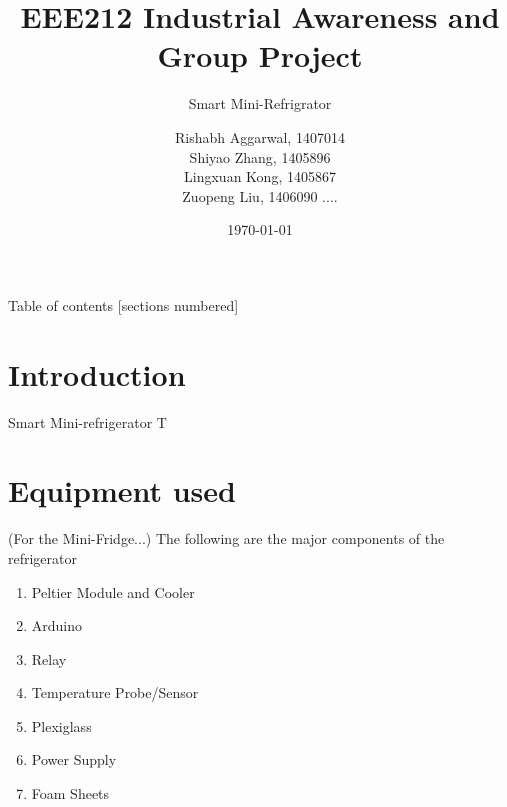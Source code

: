\documentclass[10pt]{beamer}
\title{EEE212 Industrial Awareness and Group Project}
\subtitle{Smart Mini-Refrigrator}
\date{\today}
\author{Rishabh Aggarwal, 1407014\\Shiyao Zhang, 1405896\\Lingxuan Kong, 1405867\\Zuopeng Liu, 1406090 ....}
\institute{Department of Electrical and Electronics Engineering, XJTLU}
\begin{document}
\maketitle
{
\begin{frame}{Table of contents}
  [sections numbered]
  \tableofcontents[hideallsubsections]
\end{frame}
}
\section{Introduction}
{
\begin{frame}[fragile]{Smart Mini-refrigerator}
	T
\end{frame}
}


\section{Equipment used}
{	
	\begin{frame}(For the Mini-Fridge...)
	The following are the major components of the refrigerator
	\begin{enumerate}[<+- | alert@+>]
		\item Peltier Module and Cooler
		\item Arduino
		\item Relay
		\item Temperature Probe/Sensor
		\item Plexiglass
		\item Power Supply
		\item Foam Sheets
	\end{enumerate}
\end{frame}
}
\end{document}
